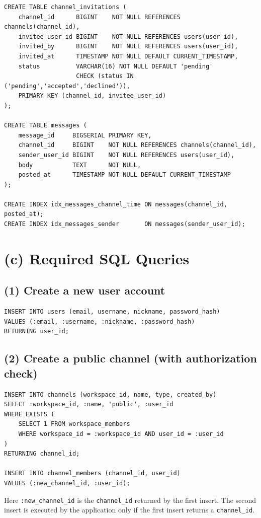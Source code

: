 \documentclass[11pt,letterpaper]{article}
\begin{document}
\begin{lstlisting}
CREATE TABLE channel_invitations (
    channel_id      BIGINT    NOT NULL REFERENCES channels(channel_id),
    invitee_user_id BIGINT    NOT NULL REFERENCES users(user_id),
    invited_by      BIGINT    NOT NULL REFERENCES users(user_id),
    invited_at      TIMESTAMP NOT NULL DEFAULT CURRENT_TIMESTAMP,
    status          VARCHAR(16) NOT NULL DEFAULT 'pending'
                    CHECK (status IN ('pending','accepted','declined')),
    PRIMARY KEY (channel_id, invitee_user_id)
);

CREATE TABLE messages (
    message_id     BIGSERIAL PRIMARY KEY,
    channel_id     BIGINT    NOT NULL REFERENCES channels(channel_id),
    sender_user_id BIGINT    NOT NULL REFERENCES users(user_id),
    body           TEXT      NOT NULL,
    posted_at      TIMESTAMP NOT NULL DEFAULT CURRENT_TIMESTAMP
);

CREATE INDEX idx_messages_channel_time ON messages(channel_id, posted_at);
CREATE INDEX idx_messages_sender       ON messages(sender_user_id);
\end{lstlisting}

\section*{(c) Required SQL Queries}

\subsection*{(1) Create a new user account}
\begin{lstlisting}
INSERT INTO users (email, username, nickname, password_hash)
VALUES (:email, :username, :nickname, :password_hash)
RETURNING user_id;
\end{lstlisting}

\subsection*{(2) Create a public channel (with authorization check)}
\begin{lstlisting}
INSERT INTO channels (workspace_id, name, type, created_by)
SELECT :workspace_id, :name, 'public', :user_id
WHERE EXISTS (
    SELECT 1 FROM workspace_members
    WHERE workspace_id = :workspace_id AND user_id = :user_id
)
RETURNING channel_id;

INSERT INTO channel_members (channel_id, user_id)
VALUES (:new_channel_id, :user_id);
\end{lstlisting}
Here \texttt{:new\_channel\_id} is the \texttt{channel\_id} returned by the
first insert. The second insert is executed by the application only if the
first insert returns a \texttt{channel\_id}.
\end{document}
